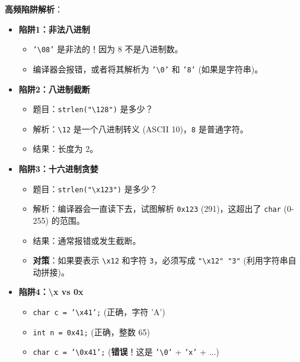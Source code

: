 \documentclass[a4paper,12pt]{article}
\begin{document}
\textbf{高频陷阱解析}：
\begin{itemize}
    \item \textbf{陷阱1：非法八进制}
    \begin{itemize}
        \item \texttt{'\textbackslash 08'} 是非法的！因为 8 不是八进制数。
        \item 编译器会报错，或者将其解析为 \texttt{'\textbackslash 0'} 和 \texttt{'8'} (如果是字符串)。
    \end{itemize}
    
    \item \textbf{陷阱2：八进制截断}
    \begin{itemize}
        \item 题目：\texttt{strlen("\textbackslash 128")} 是多少？
        \item 解析：\texttt{\textbackslash 12} 是一个八进制转义 (ASCII 10)，\texttt{8} 是普通字符。
        \item 结果：长度为 2。
    \end{itemize}

    \item \textbf{陷阱3：十六进制贪婪}
    \begin{itemize}
        \item 题目：\texttt{strlen("\textbackslash x123")} 是多少？
        \item 解析：编译器会一直读下去，试图解析 \texttt{0x123} (291)，这超出了 \texttt{char} (0-255) 的范围。
        \item 结果：通常报错或发生截断。
        \item \textbf{对策}：如果要表示 \texttt{\textbackslash x12} 和字符 \texttt{3}，必须写成 \texttt{"\textbackslash x12" "3"} (利用字符串自动拼接)。
    \end{itemize}

    \item \textbf{陷阱4：\textbackslash x vs 0x}
    \begin{itemize}
        \item \texttt{char c = '\textbackslash x41';} (正确，字符 'A')
        \item \texttt{int n = 0x41;} (正确，整数 65)
        \item \texttt{char c = '\textbackslash 0x41';} (\textbf{错误}！这是 \texttt{'\textbackslash 0'} + \texttt{'x'} + ...)
    \end{itemize}
\end{itemize}
\end{document}
